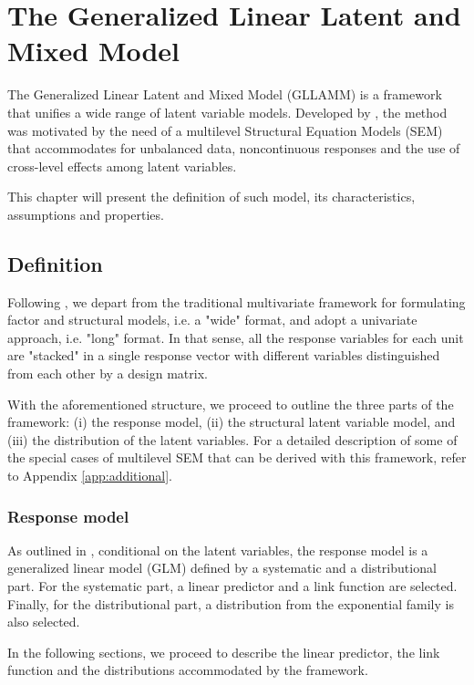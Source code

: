 \chapter{The Generalized Linear Latent and Mixed Model} \label{chap:framework}

The Generalized Linear Latent and Mixed Model (GLLAMM) is a framework that unifies a wide range of latent variable models. Developed by \citet{Rabe_et_al_2004a, Rabe_et_al_2004b Skrondal_et_al_2004}, the method was motivated by the need of a multilevel Structural Equation Models (SEM) that accommodates for unbalanced data, noncontinuous responses and the use of cross-level effects among latent variables. 

This chapter will present the definition of such model, its characteristics, assumptions and properties.


\section{Definition}
Following \citet{Rabe_et_al_2004a}, we depart from the traditional multivariate framework for formulating factor and structural models, i.e. a "wide" format, and adopt a univariate approach, i.e. "long" format. In that sense, all the response variables for each unit are "stacked" in a single response vector with different variables distinguished from each other by a design matrix.

With the aforementioned structure, we proceed to outline the three parts of the framework: (i) the response model, (ii) the structural latent variable model, and (iii) the distribution of the latent variables. For a detailed description of some of the special cases of multilevel SEM that can be derived with this framework, refer to Appendix \ref{app:additional}.


\subsection{Response model}
As outlined in \citet{Rabe_et_al_2004a, Rabe_et_al_2012}, conditional on the latent variables, the response model is a generalized linear model (GLM) defined by a systematic and a distributional part. For the systematic part, a linear predictor and a link function are selected. Finally, for the distributional part, a distribution from the exponential family is also selected. 

In the following sections, we proceed to describe the linear predictor, the link function and the distributions accommodated by the framework.


